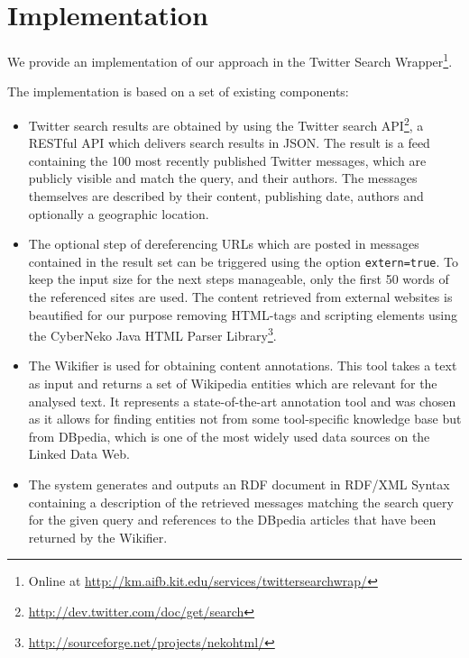 \documentclass{llncs}
\begin{document}
\section{Implementation}
\label{sect:impl}

We provide an implementation of our approach in the Twitter Search Wrapper\footnote{Online at \url{http://km.aifb.kit.edu/services/twittersearchwrap/}}.

The implementation is based on a set of existing components: 
\begin{itemize}
\item Twitter search results are obtained by using the Twitter search API\footnote{\url{http://dev.twitter.com/doc/get/search}}, a RESTful API which delivers search results in JSON. The result is a feed containing the 100 most recently published Twitter messages, which are publicly visible and match the query, and their authors. The messages themselves are described by their content, publishing date, authors
and optionally a geographic location.

\item The optional step of dereferencing URLs which are posted in messages contained
in the result set can be triggered using the option \texttt{extern=true}. To keep the input size for the next steps manageable, only the first 50 words of the referenced sites are used. The content
retrieved from external websites is beautified for our purpose removing
HTML-tags and scripting elements using the CyberNeko Java HTML Parser
Library\footnote{\url{http://sourceforge.net/projects/nekohtml/}}.

\item The Wikifier \cite{key:wikifier} is used for obtaining content annotations. This tool takes a text as input and returns a set of Wikipedia entities which are relevant for the analysed text. It represents a state-of-the-art annotation tool and was chosen as it allows for finding entities not from some tool-specific knowledge base but from DBpedia, which is one of the most widely used data sources on the Linked Data Web.

\item The system generates and outputs an RDF document in RDF/XML Syntax containing a
description of the retrieved messages matching the search query for the given query and references to the DBpedia articles that have been returned by the Wikifier. 


\end{itemize}
\end{document}
